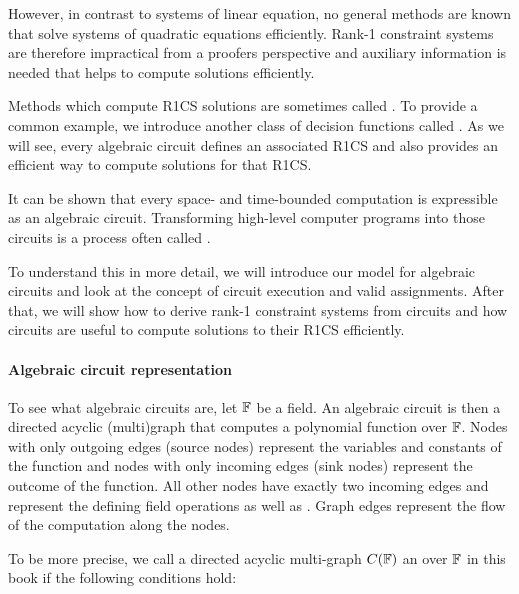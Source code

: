 However,  in contrast to systems of linear equation, no general methods are known that solve systems of quadratic equations efficiently. Rank-1 constraint systems are therefore impractical from a proofers perspective and auxiliary information is needed that helps to compute solutions efficiently.

Methods which compute R1CS solutions are sometimes called .  To provide a common example, we introduce another class of decision functions called . As we will see, every algebraic circuit defines an associated R1CS and also provides an efficient way to compute solutions for that R1CS.

It can be shown that every space- and time-bounded computation is expressible as an algebraic circuit. Transforming high-level computer programs into those circuits is a process often called . 

To understand this in more detail, we will introduce our model for algebraic circuits and look at the concept of circuit execution and valid assignments. After that, we will show how to derive rank-1 constraint systems from circuits and how circuits are useful to compute solutions to their R1CS efficiently.
\paragraph{Algebraic circuit representation} To see what algebraic circuits are, let $\mathbb{F}$ be a field. An algebraic circuit is then a directed acyclic (multi)graph that computes a polynomial function over $\mathbb{F}$. Nodes with only outgoing edges (source nodes) represent the variables and constants of the function and nodes with only incoming edges (sink nodes) represent the outcome of the function. All other nodes have exactly two incoming edges and represent the defining field operations  as well as . Graph edges represent the flow of the computation along the nodes.

To be more precise, we call a directed acyclic multi-graph $C(\mathbb{F})$  an  over $\mathbb{F}$ in this book if the following conditions hold:

